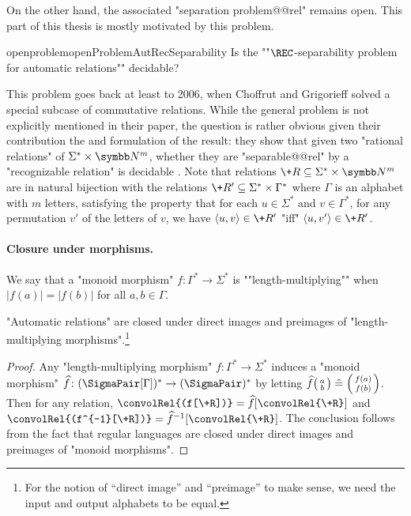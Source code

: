 On the other hand, the associated "separation problem@@rel" remains open.
This part of this thesis is mostly motivated by this problem.%
\begin{restatable}{openproblem}{openProblemAutRecSeparability}
	\label{opb:AUT-REC-separability}
	Is the ""$\REC$-separability problem for automatic relations"" decidable?
\end{restatable}

This problem goes back at least to 2006, when Choffrut and Grigorieff
solved a special subcase of commutative relations.
While the general problem is not explicitly mentioned in their paper,
the question is rather obvious given their contribution the and formulation of the result:
they show that given two "rational relations" of $\Sigma^*\times \N^m$, whether
they are "separable@@rel" by a "recognizable relation" is decidable
\cite[Theorem~1]{ChoffrutGrigorieff2006SeparabilityRationalRelations}.
Note that relations $\+R \subseteq \Sigma^*\times \N^m$ are in natural bijection
with the relations $\+R' \subseteq \Sigma^*\times \Gamma^*$ where $\Gamma$ is an alphabet
with $m$ letters, satisfying the property that for each $u \in \Sigma^*$ and $v \in \Gamma^*$,
for any permutation $v'$ of the letters of $v$, we have $\tup{u,v} \in \+R'$
"iff" $\tup{u,v'} \in \+R'$. 

\paragraph*{Closure under morphisms.}
We say that a "monoid morphism" $f\colon \Gamma^* \to \Sigma^*$ is \AP""length-multiplying""
when $|f(a)| = |f(b)|$ for all $a, b \in \Gamma$.
\begin{proposition}
	\AP\label{prop:automatic-closure-length-multiplying-morphism}
	"Automatic relations" are closed under direct images and preimages of "length-multiplying 
	morphisms".\footnote{For the notion of ``direct image'' and ``preimage'' to make sense, we need
	the input and output alphabets to be equal.}
\end{proposition}
\begin{proof}
	Any "length-multiplying morphism" $f\colon \Gamma^* \to \Sigma^*$ induces
	a "monoid morphism" $\widehat f\colon (\SigmaPair[\Gamma])^* \to (\SigmaPair)^*$ 
	by letting $\widehat f \pair{a}{b} \defeq \pair{f(a)}{f(b)}$.
	Then for any relation, $\convolRel{(f[\+R])} = \widehat f[\convolRel{\+R}]$
	and $\convolRel{(f^{-1}[\+R])} = \widehat f^{-1}[\convolRel{\+R}]$.
	The conclusion follows from the fact that regular languages are closed under
	direct images and preimages of "monoid morphisms".
\end{proof}

